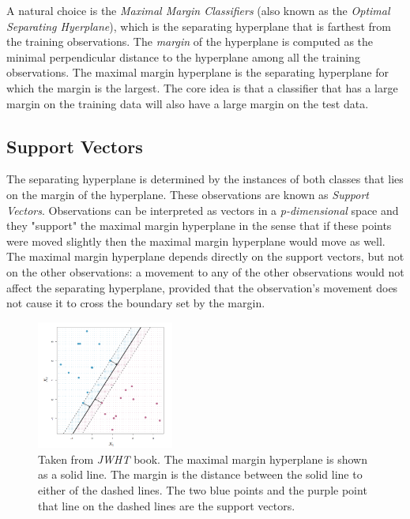 A natural choice is the \textit{Maximal Margin Classifiers} (also known as the
\textit{Optimal Separating Hyerplane}), which is the separating hyperplane that is farthest
from the training observations. The \textit{margin} of the hyperplane is computed as the
minimal perpendicular distance to the hyperplane among all the training observations.
The maximal margin hyperplane is the separating hyperplane for which the margin is the largest.
The core idea is that a classifier that has a large margin on the training data will also
have a large margin on the test data.

\subsection{Support Vectors}

The separating hyperplane is determined by the instances of both classes that lies on the margin
of the hyperplane. These observations are known as \textit{Support Vectors}.
Observations can be interpreted as vectors in a \textit{p-dimensional} space and they
"support" the maximal
margin hyperplane in the sense that if these points were moved slightly then the maximal
margin hyperplane would move as well. The maximal margin hyperplane depends directly on the
support vectors, but not on the other observations: a movement to any of the other observations
would not affect the separating hyperplane, provided that the observation's movement does not cause
it to cross the boundary set by the margin.

\begin{figure}[H]
  \centering
  \includegraphics[width=0.4\textwidth]{files/figures/method/support-vectors}
  \caption{Taken from \textit{JWHT} \cite{svm_jwht} book. The maximal margin hyperplane
  is shown as a solid line. The margin is the distance between the solid line to either
  of the dashed lines. The two blue points and the purple point that line on the
  dashed lines are the support vectors.}
  \label{fig:maxMargin}
\end{figure}

